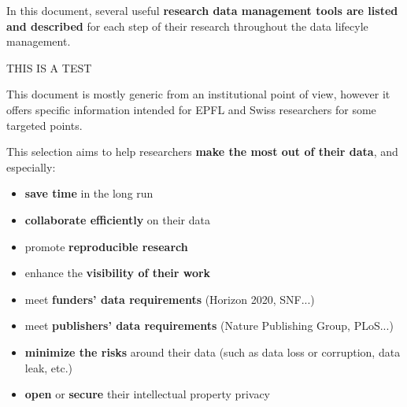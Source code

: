 In this document, several useful \textbf{research data management tools are listed and described} for each step of their research throughout the data lifecyle management.

THIS IS A TEST

\vspace{0.5cm}

This document is mostly generic from an institutional point of view, however it offers specific information intended for EPFL and Swiss researchers for some targeted points.

\vspace{0.5cm}

\noindent This selection aims to help researchers \textbf{make the most out of their data}, and especially:
\begin{itemize}
\item \textbf{save time} in the long run
\item \textbf{collaborate efficiently } on their data 
\item promote \textbf{reproducible research}
\item enhance the \textbf{visibility of their work} 
\item meet \textbf{funders' data requirements} (Horizon 2020, SNF...) 
\item meet \textbf{publishers' data requirements} (Nature Publishing Group, PLoS...) 
\item \textbf{minimize the risks} around their data (such as data loss or corruption, data leak, etc.)
\item  \textbf{open} or \textbf{secure} their intellectual property privacy
\end{itemize}


